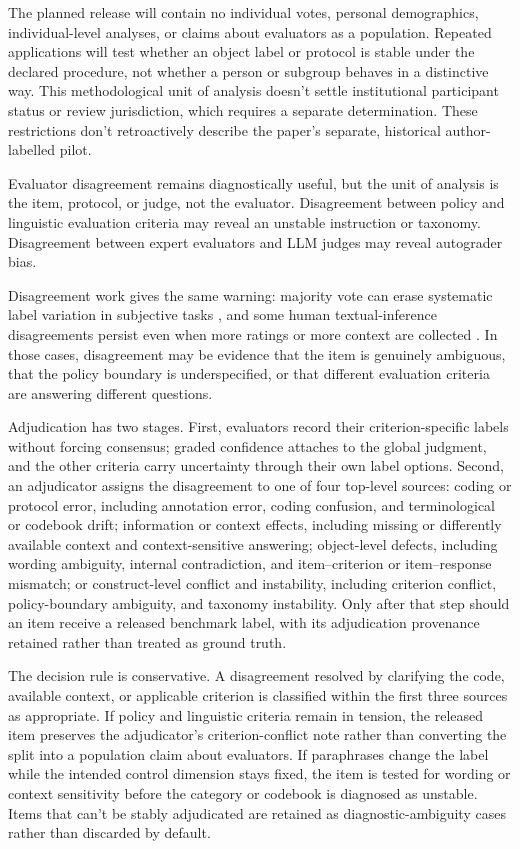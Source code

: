 The planned release will contain no individual votes, personal demographics, individual-level analyses, or claims about evaluators as a population. Repeated applications will test whether an object label or protocol is stable under the declared procedure, not whether a person or subgroup behaves in a distinctive way. This methodological unit of analysis doesn't settle institutional participant status or review jurisdiction, which requires a separate determination. These restrictions don't retroactively describe the paper's separate, historical author-labelled pilot.

Evaluator disagreement remains diagnostically useful, but the unit of analysis is the item, protocol, or judge, not the evaluator. Disagreement between policy and linguistic evaluation criteria may reveal an unstable instruction or taxonomy. Disagreement between expert evaluators and LLM judges may reveal autograder bias.

Disagreement work gives the same warning: majority vote can erase systematic label variation in subjective tasks \parencite{davani2022looking}, and some human textual-inference disagreements persist even when more ratings or more context are collected \parencite{pavlick2019inherent}. In those cases, disagreement may be evidence that the item is genuinely ambiguous, that the policy boundary is underspecified, or that different evaluation criteria are answering different questions.

Adjudication has two stages. First, evaluators record their criterion-specific labels without forcing consensus; graded confidence attaches to the global judgment, and the other criteria carry uncertainty through their own label options. Second, an adjudicator assigns the disagreement to one of four top-level sources: coding or protocol error, including annotation error, coding confusion, and terminological or codebook drift; information or context effects, including missing or differently available context and context-sensitive answering; object-level defects, including wording ambiguity, internal contradiction, and item--criterion or item--response mismatch; or construct-level conflict and instability, including criterion conflict, policy-boundary ambiguity, and taxonomy instability. Only after that step should an item receive a released benchmark label, with its adjudication provenance retained rather than treated as ground truth.

The decision rule is conservative. A disagreement resolved by clarifying the code, available context, or applicable criterion is classified within the first three sources as appropriate. If policy and linguistic criteria remain in tension, the released item preserves the adjudicator's criterion-conflict note rather than converting the split into a population claim about evaluators. If paraphrases change the label while the intended control dimension stays fixed, the item is tested for wording or context sensitivity before the category or codebook is diagnosed as unstable. Items that can't be stably adjudicated are retained as diagnostic-ambiguity cases rather than discarded by default.
